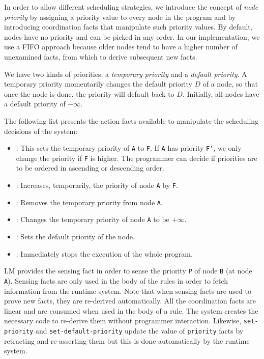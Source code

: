 
In order to allow different scheduling strategies, we introduce the concept of
\emph{node priority} by assigning a priority value to every node in the program
and by introducing coordination facts that manipulate such priority values.  By
default, nodes have no priority and can be picked in any order. In our
implementation, we use a FIFO approach because older nodes tend to have a higher
number of unexamined facts, from which to derive subsequent new facts.

We have two kinds of priorities: a \emph{temporary priority} and a \emph{default
   priority}. A temporary priority momentarily changes the default priority $D$
of a node, so that once the node is done, the priority will default back to $D$.
Initially, all nodes have a default priority of $-\infty$.

The following list presents the action facts available to manipulate the
scheduling decisions of the system:

\begin{itemize}
   \item {}: This sets the
   temporary priority of \texttt{A} to \texttt{F}. If \texttt{A} has priority
   \texttt{F'}, we only change the priority if \texttt{F} is higher. The programmer
   can decide if priorities are to be ordered in ascending or descending order.
   \item {}: Increases,
   temporarily, the priority of node \texttt{A} by \texttt{F}.
   \item {}: Removes the temporary priority from node
   \texttt{A}.
   \item {}: Changes the temporary priority of node
   \texttt{A} to be $+\infty$.
   \item {}: Sets the default
   priority of the node.
   \item {}: Immediately stops the
   execution of the whole program.
\end{itemize}

LM provides the sensing fact  in order
to sense the priority \texttt{P} of node \texttt{B} (at node \texttt{A}).
Sensing facts are only used in the body of the rules in order to fetch
information from the runtime system.  Note that when sensing facts are used to
prove new facts, they are re-derived automatically. All the coordination facts
are linear and are consumed when used in the body of a rule. The system creates
the necessary code to re-derive them without programmer interaction.  Likewise,
\texttt{set-priority} and \texttt{set-default-priority} update the value of
\texttt{priority} facts by retracting and re-asserting them but this is done
automatically by the runtime system.

